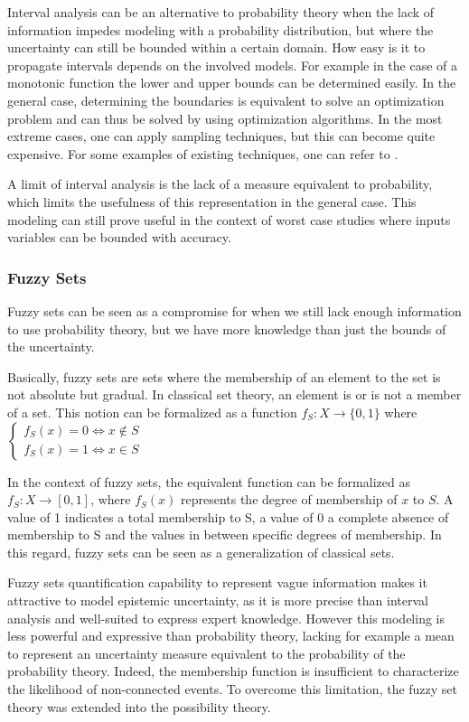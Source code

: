 Interval analysis can be an alternative to probability theory when the lack of information impedes modeling with a probability distribution, but where the uncertainty can still be bounded within a certain domain.
How easy is it to propagate intervals depends on the involved models. For example in the case of a monotonic function the lower and upper bounds can be determined easily. In the general case, determining the boundaries is equivalent to solve an optimization problem and can thus be solved by using optimization algorithms. In the most extreme cases, one can apply sampling techniques, but this can become quite expensive.
For some examples of existing techniques, one can refer to \cite{Kreinovich_2008}.

A limit of interval analysis is the lack of a measure equivalent to probability, which limits the usefulness of this representation in the general case. This modeling can still prove useful in the context of worst case studies where inputs variables can be bounded with accuracy.

\subsubsection{Fuzzy Sets}

Fuzzy sets \cite{zadeh1965fuzzy} can be seen as a compromise for when we still lack enough information to use probability theory, but we have more knowledge than just the bounds of the uncertainty.

Basically, fuzzy sets are sets where the membership of an element to the set is not absolute but gradual.
In classical set theory, an element is or is not a member of a set. This notion can be formalized as a function $f_S: X \rightarrow \{0,1\}$ where 
$\left\{
 		 \begin{array}{rcr}
			f_S(x) = 0 \Leftrightarrow x \not\in S\\
			f_S(x) = 1 \Leftrightarrow x \in S
		\end{array}
	\right. $

In the context of fuzzy sets, the equivalent function can be formalized as $f_S: X \rightarrow [0, 1]$, where $f_S(x)$ represents the degree of membership of $x$ to $S$. A value of 1 indicates a total membership to S, a value of 0 a complete absence of membership to S and the values in between specific degrees of membership.
In this regard, fuzzy sets can be seen as a generalization of classical sets.

Fuzzy sets quantification capability to represent vague information makes it attractive to model epistemic uncertainty, as it is more precise than interval analysis and well-suited to express expert knowledge. However this modeling is less powerful and expressive than probability theory, lacking for example a mean to represent an uncertainty measure equivalent to the probability of the probability theory. Indeed, the membership function is insufficient to characterize the likelihood of non-connected events.
To overcome this limitation, the fuzzy set theory was extended into the possibility theory.

